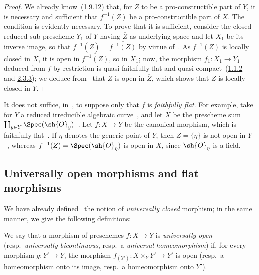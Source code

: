 \begin{proof}
We already know~{\hyperlink{ega4.c04.cor.1-9-12}{(1.9.12)}} that, for $Z$ to be a pro-constructible part of $Y$, it is necessary and sufficient that $f^{-1}(Z)$ be a pro-constructible part of $X$.
The condition is evidently necessary.
To prove that it is sufficient, consider the closed reduced sub-prescheme $Y_1$ of $Y$ having $\overline{Z}$ as underlying space and let $X_1$ be its inverse image, so that $f^{-1}(\overline{Z})=\overline{f^{-1}(Z)}$ by virtue of~.
As $f^{-1}(Z)$ is locally closed in $X$, it is open in $\overline{f^{-1}(Z)}$, so in $X_1$; now, the morphism $f_1:X_1\to Y_1$ deduced from $f$ by restriction is quasi-faithfully flat and quasi-compact~({\hyperlink{ega4.c04.prop.1-1-2}{1.1.2}} and {\hyperlink{ega4.c04.statement.2-3-3}{2.3.3}}); we deduce from~ that $Z$ is open in $\overline{Z}$, which shows that $Z$ is locally closed in $Y$.
\end{proof}

\begin{remark}[2.3.15]
\label{IV.2.3.15}
It does not suffice, in~, to suppose only that $f$ is \emph{faithfully flat}.
For example, take for $Y$ a reduced irreducible algebraic curve~, and let
$X$ be the prescheme sum $\coprod_{y\in Y}\Spec(\sh{O}_y)$~.
Let $f:X\to Y$ be the canonical morphism, which is faithfully flat~.
If $\eta$ denotes the generic point of $Y$, then $Z=\{\eta\}$ is not open in $Y$~, whereas $f^{-1}(Z)=\Spec(\sh{O}_\eta)$ is open in $X$, since $\sh{O}_\eta$ is a field.
\end{remark}

\subsection{Universally open morphisms and flat morphisms}
\label{subsection:IV.2.4}

\begin{env}[2.4.1]
\label{IV.2.4.1}
We have already defined~ the notion of \emph{universally closed} morphism; in the same manner, we give the following definitions:
\end{env}

\begin{definition}[2.4.2]
\label{IV.2.4.2}
We say that a morphism of preschemes $f:X\to Y$ is \emph{universally open} \textnormal{(}resp.\ \emph{universally bicontinuous}, resp.\ a \emph{universal homeomorphism}\textnormal{)} if, for every morphism $g:Y'\to Y$, the morphism $f_{(Y')}:X\times_Y Y'\to Y'$ is open \textnormal{(}resp.\ a homeomorphism onto its image, resp.\ a homeomorphism onto $Y'$\textnormal{)}.
\end{definition}

